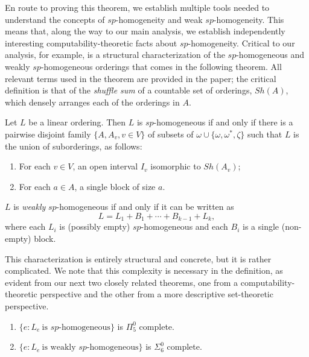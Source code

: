 \documentclass[11pt]{amsart}
\theoremstyle{definition}
\begin{document}
En route to proving this theorem, we establish multiple tools needed to understand the concepts of $sp$-homogeneity and weak $sp$-homogeneity.
This means that, along the way to our main analysis, we establish independently interesting computability-theoretic facts about $sp$-homogeneity.
Critical to our analysis, for example, is a structural characterization of the $sp$-homogeneous and weakly $sp$-homogeneous orderings that comes in the following theorem.
All relevant terms used in the theorem are provided in the paper; the critical definition is that of the \textit{shuffle sum} of a countable set of orderings, $Sh(A)$, which densely arranges each of the orderings in $A$.
\begin{theorem} Let $L$ be a linear ordering. Then
$L$ is $sp$-homogeneous if and only if there is a pairwise disjoint family $\{A,A_v, v \in V\}$ of subsets of $\omega \cup \{\omega,\omega^*,\zeta\}$ such that $L$ is the union of suborderings, as follows: 

\begin{enumerate}
\item For each $v \in V$, an open interval $I_v$ isomorphic to $Sh(A_v)$;

\item For each $a \in A$, a single block of size $a$.
\end{enumerate}
\bigskip
$L$ is \emph{weakly} $sp$-homogeneous if and only if it can be written as
\[L=L_1+B_1+\cdots+B_{k-1}+L_{k},\]
where each $L_i$ is (possibly empty) $sp$-homogeneous and each $B_i$ is a single (non-empty) block.
\end{theorem} 
This characterization is entirely structural and concrete, but it is rather complicated. We note that this  complexity is necessary in the definition, as evident from our next two closely related theorems, one from a computability-theoretic perspective and the other from a more descriptive set-theoretic perspective.
\begin{theorem}
\begin{enumerate}
    \item $\{e: L_e \ \text{is $sp$-homogeneous}\}$ is $\Pi^0_5$ complete.
    \item $\{e: L_e \ \text{is weakly $sp$-homogeneous}\}$ is $\Sigma^0_6$ complete.  
\end{enumerate}
\end{theorem}
\end{document}
